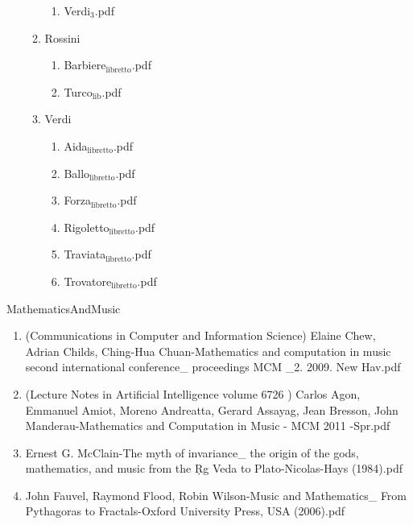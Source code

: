 \documentclass[11pt]{article}
\begin{document}
\begin{enumerate}
\begin{enumerate}
\begin{enumerate}
\item Verdi$_{\text{3}}$.pdf
\label{sec-1-1-1-1-31-9-1-9-12}
\end{enumerate}

\item Rossini
\label{sec-1-1-1-1-31-9-1-10}
\begin{enumerate}
\item Barbiere$_{\text{libretto}}$.pdf
\label{sec-1-1-1-1-31-9-1-10-1}

\item Turco$_{\text{lib}}$.pdf
\label{sec-1-1-1-1-31-9-1-10-2}
\end{enumerate}

\item Verdi
\label{sec-1-1-1-1-31-9-1-11}
\begin{enumerate}
\item Aida$_{\text{libretto}}$.pdf
\label{sec-1-1-1-1-31-9-1-11-1}

\item Ballo$_{\text{libretto}}$.pdf
\label{sec-1-1-1-1-31-9-1-11-2}

\item Forza$_{\text{libretto}}$.pdf
\label{sec-1-1-1-1-31-9-1-11-3}

\item Rigoletto$_{\text{libretto}}$.pdf
\label{sec-1-1-1-1-31-9-1-11-4}

\item Traviata$_{\text{libretto}}$.pdf
\label{sec-1-1-1-1-31-9-1-11-5}

\item Trovatore$_{\text{libretto}}$.pdf
\label{sec-1-1-1-1-31-9-1-11-6}
\end{enumerate}
\end{enumerate}
\end{enumerate}

\item MathematicsAndMusic
\label{sec-1-1-1-1-31-10}
\begin{enumerate}
\item (Communications in Computer and Information Science) Elaine Chew, Adrian Childs, Ching-Hua Chuan-Mathematics and computation in music second international conference\_ proceedings MCM \_2. 2009. New Hav.pdf
\label{sec-1-1-1-1-31-10-1}

\item (Lecture Notes in Artificial Intelligence volume 6726  ) Carlos Agon, Emmanuel Amiot, Moreno Andreatta, Gerard Assayag, Jean Bresson, John Manderau-Mathematics and Computation in Music - MCM 2011 -Spr.pdf
\label{sec-1-1-1-1-31-10-2}

\item Ernest G. McClain-The myth of invariance\_ the origin of the gods, mathematics, and music from the Ṛg Veda to Plato-Nicolas-Hays (1984).pdf
\label{sec-1-1-1-1-31-10-3}

\item John Fauvel, Raymond Flood, Robin Wilson-Music and Mathematics\_ From Pythagoras to Fractals-Oxford University Press, USA (2006).pdf
\label{sec-1-1-1-1-31-10-4}
\end{enumerate}
\end{document}
